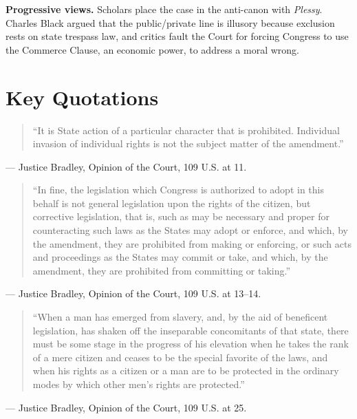 \documentclass[12pt]{article}
\begin{document}
\textbf{Progressive views.} Scholars place the case in the anti-canon with \textit{Plessy}. Charles Black argued that the public/private line is illusory because exclusion rests on state trespass law, and critics fault the Court for forcing Congress to use the Commerce Clause, an economic power, to address a moral wrong.

\section{Key Quotations}

\begin{quote}
``It is State action of a particular character that is prohibited. Individual invasion of individual rights is not the subject matter of the amendment.''
\end{quote}
\noindent --- Justice Bradley, Opinion of the Court, 109 U.S. at 11.

\begin{quote}
``In fine, the legislation which Congress is authorized to adopt in this behalf is not general legislation upon the rights of the citizen, but corrective legislation, that is, such as may be necessary and proper for counteracting such laws as the States may adopt or enforce, and which, by the amendment, they are prohibited from making or enforcing, or such acts and proceedings as the States may commit or take, and which, by the amendment, they are prohibited from committing or taking.''
\end{quote}
\noindent --- Justice Bradley, Opinion of the Court, 109 U.S. at 13--14.

\begin{quote}
``When a man has emerged from slavery, and, by the aid of beneficent legislation, has shaken off the inseparable concomitants of that state, there must be some stage in the progress of his elevation when he takes the rank of a mere citizen and ceases to be the special favorite of the laws, and when his rights as a citizen or a man are to be protected in the ordinary modes by which other men's rights are protected.''
\end{quote}
\noindent --- Justice Bradley, Opinion of the Court, 109 U.S. at 25.
\end{document}
